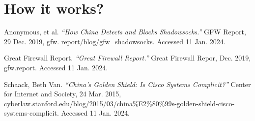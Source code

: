 \documentclass[11pt]{article}
\begin{document}
\section{How it works?}


\newpage

\begin{thebibliography}{9}
	 Anonymous, et al. \textit{``How China Detects
		and Blocks Shadowsocks.''} GFW Report, 29 Dec. 2019, gfw.
	report/blog/gfw\_shadowsocks. Accessed 11 Jan. 2024.

	 Great Firewall Report. \textit{``Great Firewall Report.''}
	Great Firewall Repor, Dec. 2019, gfw.report. Accessed 11 Jan. 2024.

	Schaack, Beth Van. \textit{``China's Golden Shield: Is Cisco Systems Complicit?''} Center
	for Internet and Society, 24 Mar. 2015, cyberlaw.stanford.edu/blog/2015/03/china\%E2\%80\%99s-golden-shield-cisco-systems-complicit.
	Accessed 11 Jan. 2024.

\end{thebibliography}
\end{document}
